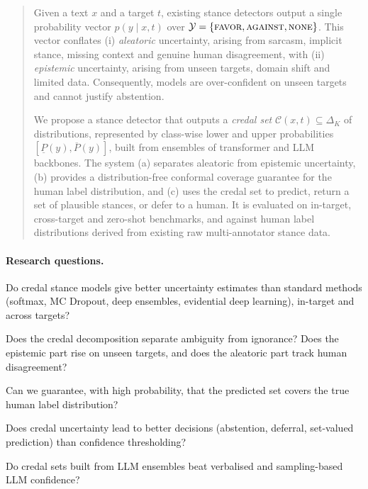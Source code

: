 \documentclass[11pt,a4paper]{article}
\newcommand{\lo}[1]{\underline{#1}}
\newcommand{\up}[1]{\overline{#1}}
\newcommand{\credal}{\mathcal{C}}
\newcommand{\simplex}{\Delta_K}
\begin{document}
\begin{quote}
Given a text $x$ and a target $t$, existing stance detectors output a single probability
vector $p(y \mid x, t)$ over $\mathcal{Y} = \{\textsc{favor}, \textsc{against},
\textsc{none}\}$. This vector conflates (i) \emph{aleatoric} uncertainty, arising from
sarcasm, implicit stance, missing context and genuine human disagreement, with (ii)
\emph{epistemic} uncertainty, arising from unseen targets, domain shift and limited data.
Consequently, models are over-confident on unseen targets and cannot justify abstention.

We propose a stance detector that outputs a \emph{credal set} $\credal(x,t) \subseteq
\simplex$ of distributions, represented by class-wise lower and upper probabilities
$[\lo{P}(y), \up{P}(y)]$, built from ensembles of transformer and LLM backbones. The system
(a) separates aleatoric from epistemic uncertainty, (b) provides a distribution-free
conformal coverage guarantee for the human label distribution, and (c) uses the credal set
to predict, return a set of plausible stances, or defer to a human. It is evaluated on
in-target, cross-target and zero-shot benchmarks, and against human label distributions
derived from existing raw multi-annotator stance data.
\end{quote}

\paragraph{Research questions.}
\begin{description}[leftmargin=1.6cm, style=nextline]
  \item[RQ1] Do credal stance models give better uncertainty estimates than standard
  methods (softmax, MC Dropout, deep ensembles, evidential deep learning), in-target and
  across targets?
  \item[RQ2] Does the credal decomposition separate ambiguity from ignorance? Does the
  epistemic part rise on unseen targets, and does the aleatoric part track human
  disagreement?
  \item[RQ3] Can we guarantee, with high probability, that the predicted set covers the true
  human label distribution?
  \item[RQ4] Does credal uncertainty lead to better decisions (abstention, deferral,
  set-valued prediction) than confidence thresholding?
  \item[RQ5] Do credal sets built from LLM ensembles beat verbalised and sampling-based LLM
  confidence?
\end{description}
\end{document}
